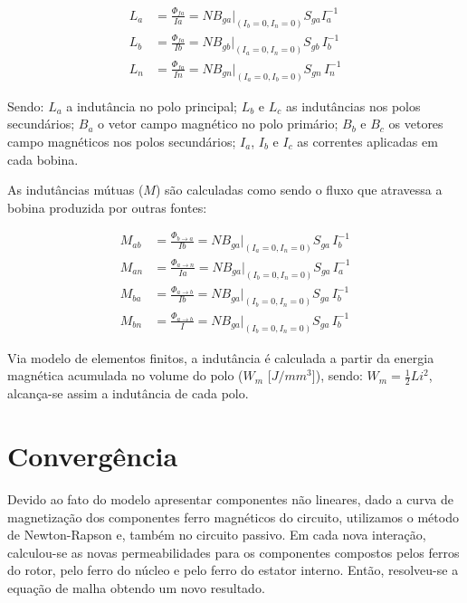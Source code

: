 \begin{align}
	L_{a} &= \frac{\Phi_{fa}}{Ia} = N B_{ga}\biggr\rvert_{(I_b = 0, I_n = 0)} S_{ga}  I_a^{-1} \\
	L_{b} &= \frac{\Phi_{fa}}{Ib} = N B_{gb}\biggr\rvert_{(I_a = 0, I_n = 0)} S_{gb} \, I_b^{-1} \\
	L_{n} &= \frac{\Phi_{fa}}{In} = N B_{gn}\biggr\rvert_{(I_a = 0, I_b = 0)} S_{gn} \, I_n^{-1}
\end{align}

Sendo: $L_a$ a indutância no polo principal; $L_b$ e $L_c$ as indutâncias nos polos secundários; $B_a$ o vetor campo magnético no polo primário; $B_b$ e $B_c$ os vetores campo magnéticos nos polos secundários; $I_a$, $I_b$ e $I_c$ as correntes aplicadas em cada bobina.

As indutâncias mútuas ($M$) são calculadas como sendo o fluxo que atravessa a bobina produzida por outras fontes:

\begin{align}
M_{ab} &= \frac{\Phi_{b \rightarrow a}}{Ib} = N B_{ga}\biggr\rvert_{(I_a = 0, I_n = 0)} S_{ga} \, I_b^{-1} \\
M_{an} &= \frac{\Phi_{a \rightarrow n}}{Ia} = N B_{ga}\biggr\rvert_{(I_b = 0, I_n = 0)} S_{ga} \, I_a^{-1} \\
M_{ba} &= \frac{\Phi_{a \rightarrow b}}{Ib} = N B_{ga}\biggr\rvert_{(I_b = 0, I_n = 0)} S_{ga} \, I_b^{-1} \\
M_{bn} &= \frac{\Phi_{a \rightarrow b}}{I} = N B_{ga}\biggr\rvert_{(I_b = 0, I_n = 0)} S_{ga} \, I_b^{-1} 
\end{align}

Via modelo de elementos finitos, a indutância é calculada a partir da energia magnética acumulada no volume do polo ($W_m$ [$J/mm^3$]), sendo: $W_m = \frac{1}{2} L i^2$, alcança-se assim a indutância de cada polo.

\section{Convergência}

Devido ao fato do modelo apresentar componentes não lineares, dado a curva de magnetização dos componentes ferro magnéticos do circuito, utilizamos o método de Newton-Rapson e, também no circuito passivo. Em cada nova interação, calculou-se as novas permeabilidades para os componentes compostos pelos ferros do rotor, pelo ferro do núcleo e pelo ferro do estator interno. Então, resolveu-se a equação de malha obtendo um novo resultado.

